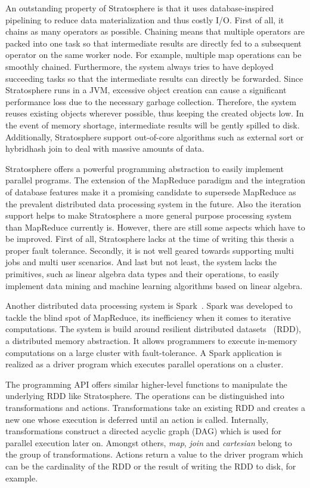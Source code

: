 An outstanding property of Stratosphere is that it uses database-inspired pipelining to reduce data materialization and thus costly I/O.
First of all, it chains as many operators as possible.
Chaining means that multiple operators are packed into one task so that intermediate results are directly fed to a subsequent operator on the same worker node.
For example, multiple map operations can be smoothly chained.
Furthermore, the system always tries to have deployed succeeding tasks so that the intermediate results can directly be forwarded.
Since Stratosphere runs in a JVM, excessive object creation can cause a significant performance loss due to the necessary garbage collection.
Therefore, the system reuses existing objects wherever possible, thus keeping the created objects low.
In the event of memory shortage, intermediate results will be gently spilled to disk.
Additionally, Stratosphere support out-of-core algorithms such as external sort or hybridhash join to deal with massive amounts of data.

Stratosphere offers a powerful programming abstraction to easily implement parallel programs.
The extension of the MapReduce paradigm and the integration of database features make it a promising candidate to supersede MapReduce as the prevalent distributed data processing system in the future.
Also the iteration support helps to make Stratosphere a more general purpose processing system than MapReduce currently is.
However, there are still some aspects which have to be improved.
First of all, Stratosphere lacks at the time of writing this thesis a proper fault tolerance.
Secondly, it is not well geared towards supporting multi jobs and multi user scenarios.
And last but not least, the system lacks the primitives, such as linear algebra data types and their operations, to easily implement data mining and machine learning algorithms based on linear algebra.

Another distributed data processing system is Spark~\cite{zaharia:2010a}.
Spark was developed to tackle the blind spot of MapReduce, its inefficiency when it comes to iterative computations.
The system is build around resilient distributed datasets~\cite{zaharia:2012a} (RDD), a distributed memory abstraction.
It allows programmers to execute in-memory computations on a large cluster with fault-tolerance.
A Spark application is realized as a driver program which executes parallel operations on a cluster.

The programming API offers similar higher-level functions to manipulate the underlying RDD like Stratosphere.
The operations can be distinguished into transformations and actions.
Transformations take an existing RDD and creates a new one whose execution is deferred until an action is called.
Internally, transformations construct a directed acyclic graph (DAG) which is used for parallel execution later on.
Amongst others, \emph{map}, \emph{join} and \emph{cartesian} belong to the group of transformations.
Actions return a value to the driver program which can be the cardinality of the RDD or the result of writing the RDD to disk, for example.

